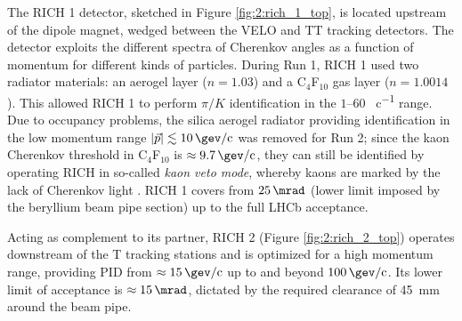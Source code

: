 The RICH 1 detector, sketched in Figure \ref{fig:2:rich_1_top}, is located upstream of the dipole magnet, wedged between the VELO and TT tracking detectors.
The detector exploits the different spectra of Cherenkov angles as a function of momentum for different kinds of particles.
During Run 1, RICH 1 used two radiator materials: an aerogel layer ($n=1.03$) and a C$_4$F$_{10}$ gas layer ($n=1.0014$).
This allowed RICH 1 to perform $\pi/K$ identification in the $1$--$60$ \si{\gev\per c} range.
Due to occupancy problems, the silica aerogel radiator providing identification in the low momentum range $|\vec{p}| \lesssim \SI{10}{\gev\per c}$ was removed for Run 2;
since the kaon Cherenkov threshold in C$_4$F$_{10}$ is $\approx \SI{9.7}{\gev\per c}$, they can still be identified by operating RICH in so-called \textit{kaon veto mode}, whereby kaons are marked by the lack of Cherenkov light \cite{HistoryLHCb} \cite{RichPerformance}.
RICH 1 covers from $\SI{25}{\mrad}$ (lower limit imposed by the beryllium beam pipe section) up to the full LHCb acceptance.

Acting as complement to its partner, RICH 2 (Figure \ref{fig:2:rich_2_top}) operates downstream of the T tracking stations and is optimized for a high momentum range, providing PID from $\approx \SI{15}{\gev\per c}$ up to and beyond $\SI{100}{\gev\per c}$.
Its lower limit of acceptance is $\approx \SI{15}{\mrad}$, dictated by the required clearance of \SI{45}{\milli\meter} around the beam pipe.

